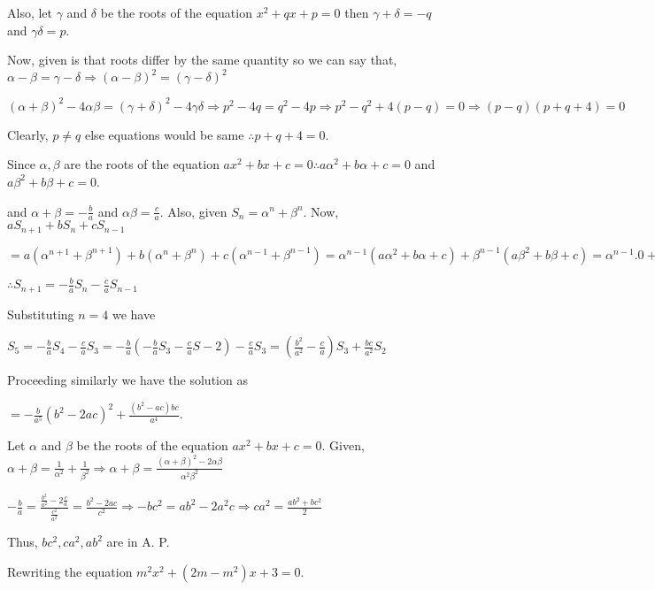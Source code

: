   Also, let $\gamma$ and $\delta$ be the roots of the equation $x^2 + qx + p = 0$ then $\gamma + \delta =
  -q$ and $\gamma\delta = p$.

  Now, given is that roots differ by the same quantity so we can say that, $\alpha - \beta = \gamma -
  \delta\Rightarrow (\alpha - \beta)^2 = (\gamma - \delta)^2$

  $(\alpha + \beta)^2 - 4\alpha\beta = (\gamma + \delta)^2 - 4\gamma\delta\Rightarrow p^2 - 4q = q^2 - 4p
  \Rightarrow p^2 - q^2 + 4(p - q) = 0 \Rightarrow (p - q)(p + q + 4) = 0$

  Clearly, $p \neq q$ else equations would be same $\therefore p + q + 4 = 0$.
\item Since $\alpha, \beta$ are the roots of the equation $ax^2 + bx + c = 0\therefore a\alpha^2 + b\alpha +
  c = 0$ and $a\beta^2 + b\beta + c = 0$.

  and $\alpha + \beta = -\frac{b}{a}$ and $\alpha\beta = \frac{c}{a}.$ Also, given $S_n = \alpha^n +
  \beta^n$. Now, $aS_{n + 1} + bS_n + cS_{n - 1}$

  $= a(\alpha^{n + 1} + \beta^{n + 1}) + b(\alpha^n + \beta^n) + c(\alpha^{n - 1} + \beta^{n - 1}) =
  \alpha^{n - 1}(a\alpha^2 + b\alpha + c) + \beta^{n - 1}(a\beta^2 + b\beta + c) = \alpha^{n - 1}.0 +
  \beta^{n - 1}.0$

  $\therefore S_{n + 1} = -\frac{b}{a}S_n -\frac{c}{a}S_{n - 1}$

  Substituting $n = 4$ we have

  $S_5 = -\frac{b}{a}S_4 - \frac{c}{a}S_3 = -\frac{b}{a}(-\frac{b}{a}S_3 - \frac{c}{a}S-2) - \frac{c}{a}S_3
  = \left(\frac{b^2}{a^2} - \frac{c}{a}\right)S_3 + \frac{bc}{a^2}S_2$

  Proceeding similarly we have the solution as

  $= -\frac{b}{a^5}(b^2 - 2ac)^2 + \frac{(b^2 - ac)bc}{a^4}$.
\item Let $\alpha$ and $\beta$ be the roots of the equation $ax^2 + bx + c = 0$. Given, $\alpha + \beta =
  \frac{1}{\alpha^2} + \frac{1}{\beta^2}\Rightarrow \alpha + \beta = \frac{(\alpha + \beta)^2 -
    2\alpha\beta}{\alpha^2\beta^2}$

  $-\frac{b}{a} = \frac{\frac{b^2}{a^2} - 2\frac{c}{a}}{\frac{c^2}{a^2}} = \frac{b^2 - 2ac}{c^2}\Rightarrow
  -bc^2 = ab^2 - 2a^2c \Rightarrow ca^2 = \frac{ab^2 + bc^2}{2}$

  Thus, $bc^2, ca^2, ab^2$ are in A. P.
\item Rewriting the equation $m^2x^2 + (2m - m^2)x + 3 = 0$.

